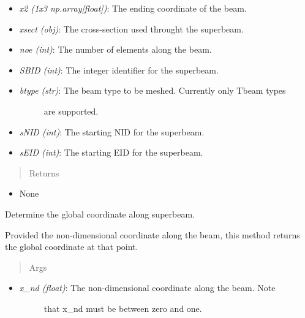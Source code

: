 \documentclass[letterpaper,10pt,english]{sphinxmanual}
\begin{document}
\begin{fulllineitems}
\begin{fulllineitems}
\begin{itemize}
\item {} 
\emph{x2 (1x3 np.array{[}float{]})}: The ending coordinate of the beam.

\item {} 
\emph{xsect (obj)}: The cross-section used throught the superbeam.

\item {} 
\emph{noe (int)}: The number of elements along the beam.

\item {} 
\emph{SBID (int)}: The integer identifier for the superbeam.

\item {} \begin{description}
\item[{\emph{btype (str)}: The beam type to be meshed. Currently only Tbeam types}] \leavevmode
are supported.

\end{description}

\item {} 
\emph{sNID (int)}: The starting NID for the superbeam.

\item {} 
\emph{sEID (int)}: The starting EID for the superbeam.

\end{itemize}
\begin{quote}\begin{description}
\item[{Returns}] \leavevmode
\end{description}\end{quote}
\begin{itemize}
\item {} 
None

\end{itemize}

\end{fulllineitems}


\begin{fulllineitems}
\label{structures:AeroComBAT.Structures.SuperBeam.getBeamCoord}
Determine the global coordinate along superbeam.

Provided the non-dimensional coordinate along the beam, this method
returns the global coordinate at that point.
\begin{quote}\begin{description}
\item[{Args}] \leavevmode
\end{description}\end{quote}
\begin{itemize}
\item {} \begin{description}
\item[{\emph{x\_nd (float)}: The non-dimensional coordinate along the beam. Note}] \leavevmode
that x\_nd must be between zero and one.


\end{description}
\end{itemize}
\end{fulllineitems}
\end{fulllineitems}
\end{document}
